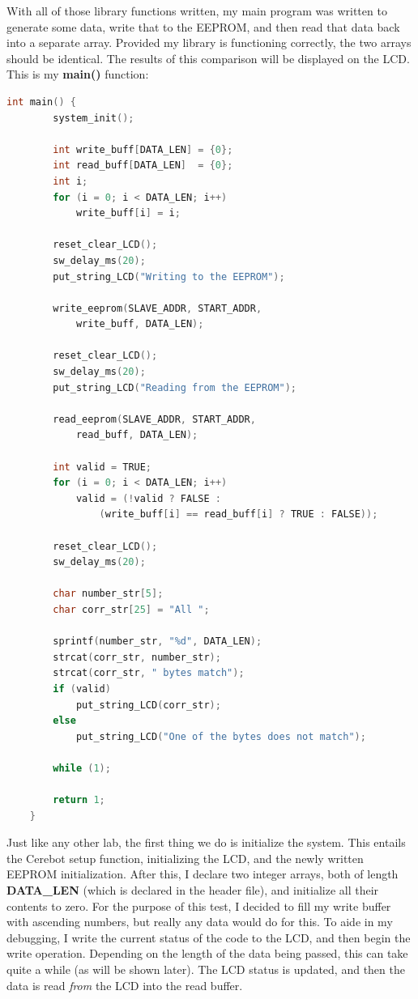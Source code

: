 \documentclass[a4paper, 12pt]{article}
\begin{document}
With all of those library functions written, my main program was written to generate some data, write that to the EEPROM, and then read that data back into a separate array. Provided my library is functioning correctly, the two arrays should be identical. The results of this comparison will be displayed on the LCD. This is my \textbf{main()} function:

	\begin{mdframed}[backgroundcolor=code-gray, roundcorner=10pt,
								innerleftmargin=5, innertopmargin=5, innerbottommargin=5]	
	\begin{lstlisting}[language=C, caption=Main Program, tabsize=2]
	int main() {
		system_init();

		int write_buff[DATA_LEN] = {0};
		int read_buff[DATA_LEN]  = {0};
		int i;
		for (i = 0; i < DATA_LEN; i++)
			write_buff[i] = i;

		reset_clear_LCD();
		sw_delay_ms(20);
		put_string_LCD("Writing to the EEPROM");

		write_eeprom(SLAVE_ADDR, START_ADDR,
			write_buff, DATA_LEN);

		reset_clear_LCD();
		sw_delay_ms(20);
		put_string_LCD("Reading from the EEPROM");

		read_eeprom(SLAVE_ADDR, START_ADDR,
			read_buff, DATA_LEN);

		int valid = TRUE;
		for (i = 0; i < DATA_LEN; i++)
			valid = (!valid ? FALSE :
				(write_buff[i] == read_buff[i] ? TRUE : FALSE));

		reset_clear_LCD();
		sw_delay_ms(20);
	
		char number_str[5];
		char corr_str[25] = "All ";

		sprintf(number_str, "%d", DATA_LEN);
		strcat(corr_str, number_str);
		strcat(corr_str, " bytes match");
		if (valid) 
			put_string_LCD(corr_str);
		else
			put_string_LCD("One of the bytes does not match");

		while (1);

		return 1;
	}
	\end{lstlisting}
	\end{mdframed}
	
Just like any other lab, the first thing we do is initialize the system. This entails the Cerebot setup function, initializing the LCD, and the newly written EEPROM initialization. After this, I declare two integer arrays, both of length \textbf{DATA\_LEN} (which is declared in the header file), and initialize all their contents to zero. For the purpose of this test, I decided to fill my write buffer with ascending numbers, but really any data would do for this. To aide in my debugging, I write the current status of the code to the LCD, and then begin the write operation. Depending on the length of the data being passed, this can take quite a while (as will be shown later). The LCD status is updated, and then the data is read \textit{from} the LCD into the read buffer.
\end{document}
